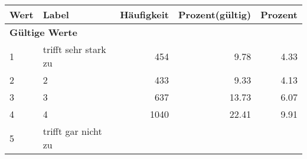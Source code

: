      \begin{longtable}{lXrrr}
     \toprule
     \textbf{Wert} & \textbf{Label} & \textbf{Häufigkeit} & \textbf{Prozent(gültig)} & \textbf{Prozent} \\
     \endhead
     \midrule
     \multicolumn{5}{l}{\textbf{Gültige Werte}}\\

     1 &
     \multicolumn{1}{X}{ trifft sehr stark zu   } &


       \num{454} &
       \num[round-mode=places,round-precision=2]{9.78} &
         \num[round-mode=places,round-precision=2]{4.33} \\

     2 &
     \multicolumn{1}{X}{ 2   } &


       \num{433} &
       \num[round-mode=places,round-precision=2]{9.33} &
         \num[round-mode=places,round-precision=2]{4.13} \\

     3 &
     \multicolumn{1}{X}{ 3   } &


       \num{637} &
       \num[round-mode=places,round-precision=2]{13.73} &
         \num[round-mode=places,round-precision=2]{6.07} \\

     4 &
     \multicolumn{1}{X}{ 4   } &


       \num{1040} &
       \num[round-mode=places,round-precision=2]{22.41} &
         \num[round-mode=places,round-precision=2]{9.91} \\

     5 &
     \multicolumn{1}{X}{ trifft gar nicht zu   } &



\end{longtable}
